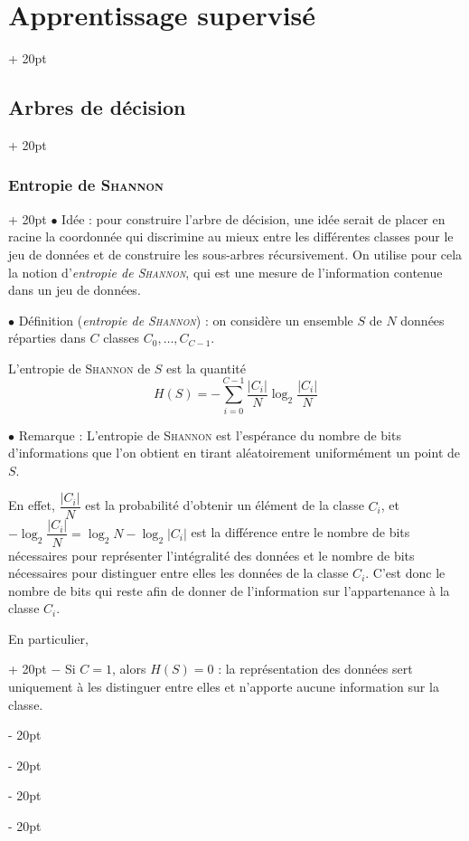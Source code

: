\documentclass[a4paper, 12pt, twoside]{article}
\newcommand{\abs}[1]{\left\lvert #1 \right\rvert}
\newcommand{\ind}[1][20pt]{\advance\leftskip + #1}
\newcommand{\deind}[1][20pt]{\advance\leftskip - #1}
\newenvironment{indt}[2][20pt]{#2 \par \ind[#1]}{\par \deind} %
\begin{document}
\begin{indt}{\section{Apprentissage supervisé}}
\begin{indt}{\subsection{Arbres de décision}}
            \vspace{12pt}
            
            \begin{indt}{\subsubsection{Entropie de \textsc{Shannon}}}
                $\bullet$ Idée : pour construire l'arbre de décision, une idée serait de placer en racine la coordonnée qui discrimine au mieux entre les différentes classes pour le jeu de données et de construire les sous-arbres récursivement.
                On utilise pour cela la notion d'\emph{entropie de \textsc{Shannon}}, qui est une mesure de l'information contenue dans un jeu de données.

                \vspace{12pt}
                
                $\bullet$ Définition (\textit{entropie de \textsc{Shannon}}) :
                on considère un ensemble $S$ de $N$ données réparties dans $C$ classes $C_0, \ldots, C_{C - 1}$.

                L'entropie de \textsc{Shannon} de $S$ est la quantité
                \[
                    H(S) = -\sum_{i = 0}^{C - 1} \dfrac{\abs{C_i}}{N} \log_2 \dfrac{\abs{C_i}}{N}
                \]

                \vspace{12pt}
                
                $\bullet$ Remarque : L'entropie de \textsc{Shannon} est l'espérance du nombre de bits d'informations que l'on obtient en tirant aléatoirement uniformément un point de $S$.

                En effet, $\dfrac{\abs{C_i}} N$ est la probabilité d'obtenir un élément de la classe $C_i$, et $-\log_2 \dfrac{\abs{C_i}}N = \log_2 N - \log_2 \abs{C_i}$ est la différence entre le nombre de bits nécessaires pour représenter l'intégralité des données et le nombre de bits nécessaires pour distinguer entre elles les données de la classe $C_i$.
                C'est donc le nombre de bits qui reste afin de donner de l'information sur l'appartenance à la classe $C_i$.

                \begin{indt}{En particulier,}
                    $-$ Si $C = 1$, alors $H(S) = 0$ : la représentation des données sert uniquement à les distinguer entre elles et n'apporte aucune information sur la classe.
                    

\end{indt}
\end{indt}
\end{indt}
\end{indt}
\end{document}
